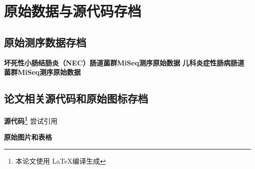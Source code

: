 \chapter{原始数据与源代码存档}

\section{原始测序数据存档}
\textbf{坏死性小肠结肠炎（NEC）肠道菌群MiSeq测序原始数据}
\textbf{儿科炎症性肠病肠道菌群MiSeq测序原始数据}

\section{论文相关源代码和原始图标存档}
\textbf{源代码\footnote{本论文使用 \LaTeX 编译生成}}
尝试引用\cite{collier2005innate}

\textbf{原始图片和表格}
